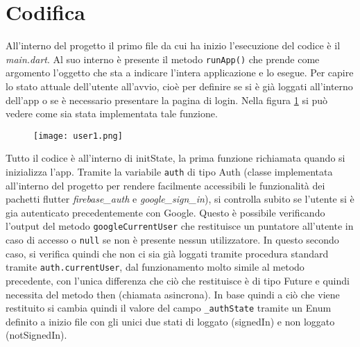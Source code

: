 \section{Codifica}
All'interno del progetto il primo file da cui ha inizio l'esecuzione del codice è il
\textit{main.dart}. Al suo interno è presente il metodo \verb|runApp()| che
prende come argomento l'oggetto che sta a indicare l'intera applicazione e lo esegue.
Per capire lo stato attuale dell'utente all'avvio, cioè per definire se si è già
loggati all'interno dell'app o se è necessario presentare la pagina di login.
Nella figura \ref{user1} si può vedere come sia stata implementata tale funzione.
\begin{figure}[!h]
    \centering
    \texttt{[image: user1.png]}
    \caption{}
    \label{user1}
\end{figure}
Tutto il codice è all'interno di initState, la prima funzione
richiamata quando si inizializza l'app. Tramite la variabile \verb|auth| di tipo
Auth (classe implementata all'interno del progetto per rendere facilmente
accessibili le funzionalità dei pachetti flutter \textit{firebase\_auth} e
\textit{google\_sign\_in}), si controlla subito se l'utente si è gia autenticato
precedentemente con Google. Questo è possibile verificando l'output del metodo
\verb|googleCurrentUser| che restituisce un puntatore all'utente in caso di accesso o
\verb|null| se non è presente nessun utilizzatore. In questo secondo caso, si
verifica quindi che non ci sia già loggati tramite procedura standard tramite
\verb|auth.currentUser|, dal funzionamento molto simile al metodo precedente,
con l'unica differenza che ciò che restituisce è di tipo Future e quindi
necessita del metodo then (chiamata asincrona). In base quindi a ciò che viene
restituito si cambia quindi il valore del campo \verb|_authState| tramite un
Enum definito a inizio file con gli unici due stati di loggato (signedIn) e non
loggato (notSignedIn).

